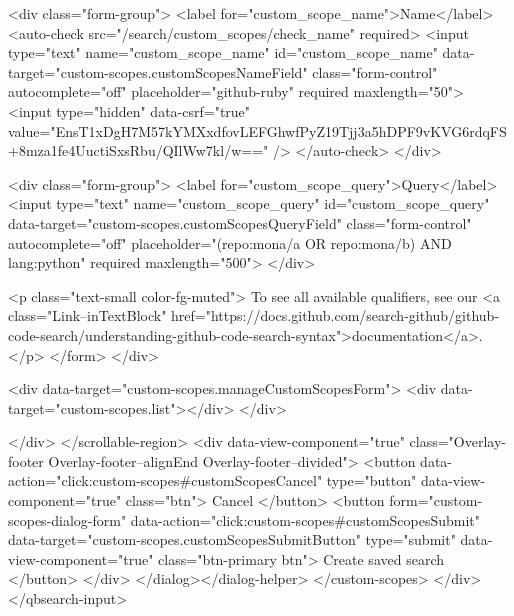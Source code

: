           <div class="form-group">
            <label for="custom_scope_name">Name</label>
            <auto-check src="/search/custom_scopes/check_name" required>
              <input
                type="text"
                name="custom_scope_name"
                id="custom_scope_name"
                data-target="custom-scopes.customScopesNameField"
                class="form-control"
                autocomplete="off"
                placeholder="github-ruby"
                required
                maxlength="50">
              <input type="hidden" data-csrf="true" value="EnsT1xDgH7M57kYMXxdfovLEFGhwfPyZ19Tjj3a5hDPF9vKVG6rdqFS+8mza1fe4UuctiSxsRbu/QIlWw7kl/w==" />
            </auto-check>
          </div>

          <div class="form-group">
            <label for="custom_scope_query">Query</label>
            <input
              type="text"
              name="custom_scope_query"
              id="custom_scope_query"
              data-target="custom-scopes.customScopesQueryField"
              class="form-control"
              autocomplete="off"
              placeholder="(repo:mona/a OR repo:mona/b) AND lang:python"
              required
              maxlength="500">
          </div>

          <p class="text-small color-fg-muted">
            To see all available qualifiers, see our <a class="Link--inTextBlock" href="https://docs.github.com/search-github/github-code-search/understanding-github-code-search-syntax">documentation</a>.
          </p>
</form>        </div>

        <div data-target="custom-scopes.manageCustomScopesForm">
          <div data-target="custom-scopes.list"></div>
        </div>

</div>
      </scrollable-region>
      <div data-view-component="true" class="Overlay-footer Overlay-footer--alignEnd Overlay-footer--divided">          <button data-action="click:custom-scopes#customScopesCancel" type="button" data-view-component="true" class="btn">    Cancel
</button>
          <button form="custom-scopes-dialog-form" data-action="click:custom-scopes#customScopesSubmit" data-target="custom-scopes.customScopesSubmitButton" type="submit" data-view-component="true" class="btn-primary btn">    Create saved search
</button>
</div>
</dialog></dialog-helper>
    </custom-scopes>
  </div>
</qbsearch-input>


